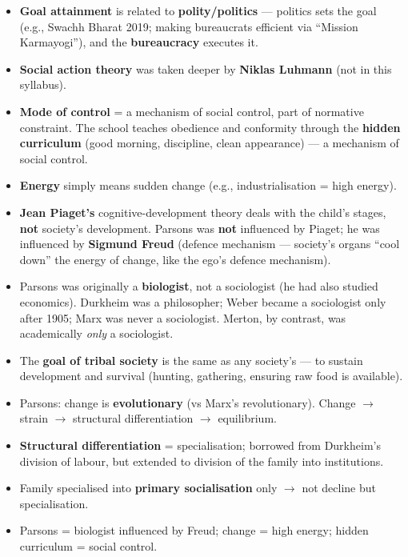 \begin{DataFact}
\begin{itemize}
\item \textbf{Goal attainment} is related to \textbf{polity/politics} --- politics sets the goal (e.g., Swachh Bharat 2019; making bureaucrats efficient via ``Mission Karmayogi''), and the \textbf{bureaucracy} executes it.
\item \textbf{Social action theory} was taken deeper by \textbf{Niklas Luhmann} (not in this syllabus).
\item \textbf{Mode of control} = a mechanism of social control, part of normative constraint. The school teaches obedience and conformity through the \textbf{hidden curriculum} (good morning, discipline, clean appearance) --- a mechanism of social control.
\item \textbf{Energy} simply means sudden change (e.g., industrialisation = high energy).
\item \textbf{Jean Piaget's} cognitive-development theory deals with the child's stages, \textbf{not} society's development. Parsons was \textbf{not} influenced by Piaget; he was influenced by \textbf{Sigmund Freud} (defence mechanism --- society's organs ``cool down'' the energy of change, like the ego's defence mechanism).
\item Parsons was originally a \textbf{biologist}, not a sociologist (he had also studied economics). Durkheim was a philosopher; Weber became a sociologist only after 1905; Marx was never a sociologist. Merton, by contrast, was academically \textit{only} a sociologist.
\item The \textbf{goal of tribal society} is the same as any society's --- to sustain development and survival (hunting, gathering, ensuring raw food is available).
\end{itemize}
\end{DataFact}

\begin{QuickRevision}
\begin{itemize}
\item Parsons: change is \textbf{evolutionary} (vs Marx's revolutionary). Change $\rightarrow$ strain $\rightarrow$ structural differentiation $\rightarrow$ equilibrium.
\item \textbf{Structural differentiation} = specialisation; borrowed from Durkheim's division of labour, but extended to division of the family into institutions.
\item Family specialised into \textbf{primary socialisation} only $\rightarrow$ not decline but specialisation.
\item Parsons = biologist influenced by Freud; change = high energy; hidden curriculum = social control.
\end{itemize}
\end{QuickRevision}

